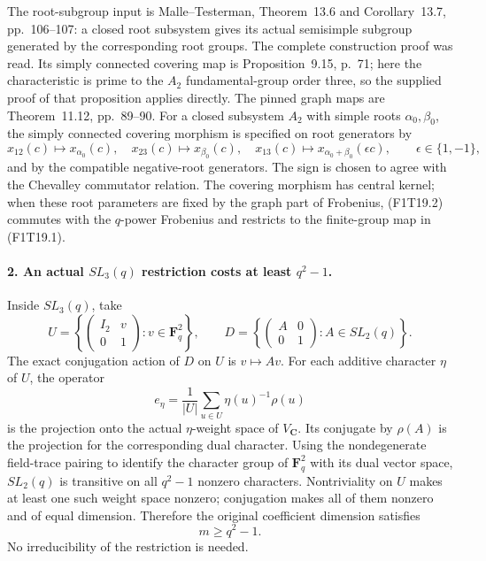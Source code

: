 The root-subgroup input is Malle--Testerman,
Theorem~13.6 and Corollary~13.7, pp.~106--107:
a closed root subsystem gives its actual semisimple
subgroup generated by the corresponding root groups.
The complete construction proof was read. Its simply
connected covering map is Proposition~9.15, p.~71;
here the characteristic is prime to the \(A_2\)
fundamental-group order three, so the supplied proof
of that proposition applies directly. The pinned graph
maps are Theorem~11.12, pp.~89--90. For a closed
subsystem \(A_2\) with simple roots \(\alpha_0,\beta_0\),
the simply connected covering morphism is specified on
root generators by
\[
 x_{12}(c)\longmapsto x_{\alpha_0}(c),\quad
 x_{23}(c)\longmapsto x_{\beta_0}(c),\quad
 x_{13}(c)\longmapsto x_{\alpha_0+\beta_0}(\epsilon c),
 \qquad \epsilon\in\{1,-1\},
 \tag{F1T19.2}
\]
and by the compatible negative-root generators. The sign
is chosen to agree with the Chevalley commutator relation.
The covering morphism has central kernel; when these
root parameters are fixed by the graph part of Frobenius,
(F1T19.2) commutes with the \(q\)-power Frobenius and
restricts to the finite-group map in (F1T19.1).

\paragraph{2. An actual \(SL_3(q)\) restriction costs at least \(q^2-1\).}
Inside \(SL_3(q)\), take
\[
 U=\left\{\begin{pmatrix}I_2&v\\0&1\end{pmatrix}:
                              v\in\mathbf F_q^2\right\},
 \qquad
 D=\left\{\begin{pmatrix}A&0\\0&1\end{pmatrix}:
                              A\in SL_2(q)\right\}.
 \tag{F1T19.3}
\]
The exact conjugation action of \(D\) on \(U\) is
\(v\mapsto Av\). For each additive character \(\eta\)
of \(U\), the operator
\[
             e_\eta=\frac1{|U|}
                   \sum_{u\in U}\eta(u)^{-1}\rho(u)
 \tag{F1T19.4}
\]
is the projection onto the actual \(\eta\)-weight space
of \(V_{\mathbf C}\). Its conjugate by \(\rho(A)\)
is the projection for the corresponding dual character.
Using the nondegenerate field-trace pairing to identify
the character group of \(\mathbf F_q^2\) with its dual
vector space, \(SL_2(q)\) is transitive on all \(q^2-1\)
nonzero characters. Nontriviality on \(U\) makes at
least one such weight space nonzero; conjugation makes
all of them nonzero and of equal dimension. Therefore
the original coefficient dimension satisfies
\[
                              m\ge q^2-1.
 \tag{F1T19.5}
\]
No irreducibility of the restriction is needed.

